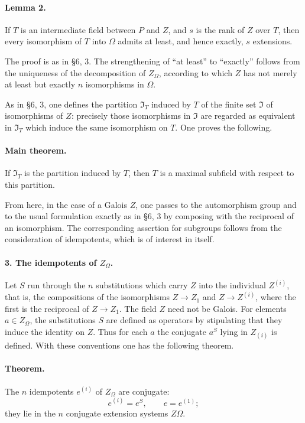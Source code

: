 \documentclass[11pt]{article}
\begin{document}
\paragraph{Lemma 2.}
If \(T\) is an intermediate field between \(P\) and \(Z\), and \(s\) is the rank of \(Z\) over \(T\), then every isomorphism of \(T\) into \(\Omega\) admits at least, and hence exactly, \(s\) extensions.

The proof is as in §6, 3. The strengthening of “at least” to “exactly” follows from the uniqueness of the decomposition of \(Z_\Omega\), according to which \(Z\) has not merely at least but exactly \(n\) isomorphisms in \(\Omega\).

As in §6, 3, one defines the partition \(\mathfrak I_T\) induced by \(T\) of the finite set \(\mathfrak I\) of isomorphisms of \(Z\): precisely those isomorphisms in \(\mathfrak I\) are regarded as equivalent in \(\mathfrak I_T\) which induce the same isomorphism on \(T\). One proves the following.

\paragraph{Main theorem.}
If \(\mathfrak I_T\) is the partition induced by \(T\), then \(T\) is a maximal subfield with respect to this partition.

From here, in the case of a Galois \(Z\), one passes to the automorphism group and to the usual formulation exactly as in §6, 3 by composing with the reciprocal of an isomorphism. The corresponding assertion for subgroups follows from the consideration of idempotents, which is of interest in itself.

\paragraph{3. The idempotents of \(Z_\Omega\).}
Let \(S\) run through the \(n\) substitutions which carry \(Z\) into the individual \(Z^{(i)}\), that is, the compositions of the isomorphisms \(Z\to Z_1\) and \(Z\to Z^{(i)}\), where the first is the reciprocal of \(Z\to Z_1\). The field \(Z\) need not be Galois. For elements \(a\in Z_\Omega\), the substitutions \(S\) are defined as operators by stipulating that they induce the identity on \(Z\). Thus for each \(a\) the conjugate \(a^S\) lying in \(Z_{(i)}\) is defined. With these conventions one has the following theorem.

\paragraph{Theorem.}
The \(n\) idempotents \(e^{(i)}\) of \(Z_\Omega\) are conjugate:
\[
        e^{(i)}=e^S,\qquad e=e^{(1)};
\]
they lie in the \(n\) conjugate extension systems \(Z\Omega\).
\end{document}
